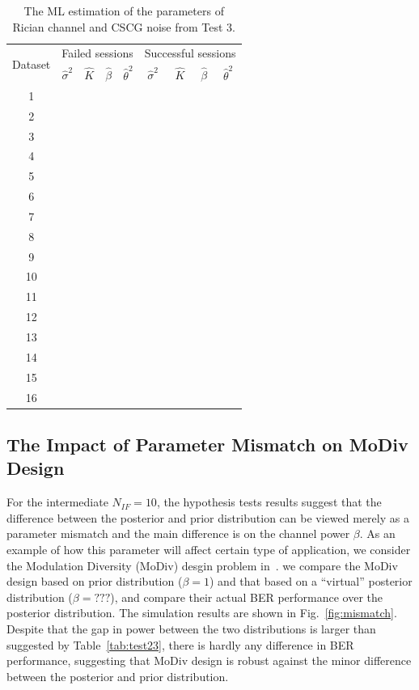 \documentclass[journal,draftcls,onecolumn,12pt,twoside]{IEEEtran}
\begin{document}
\begin{table}[!t]
  \renewcommand{\arraystretch}{1.3}
  \caption{The ML estimation of the parameters of Rician channel and CSCG
  noise from Test 3.}
  \label{tab:ML}
  \centering
  \begin{tabular}{c|cccc|cccc}
    \hline
    \multirow{2}{*}{Dataset}  & \multicolumn{4}{c|}{Failed sessions} &
    \multicolumn{4}{c}{Successful sessions} \\
    \cline{2-9}
    & $\hat{\sigma}^2$ & $\hat{K}$ & $\hat{\beta}$ & $\hat{\theta}^2$ &
    $\hat{\sigma}^2$ & $\hat{K}$ & $\hat{\beta}$ & $\hat{\theta}^2$ \\
    \hline
    1 &  &  &  &  &  &  &  &  \\
    2 &  &  &  &  &  &  &  & \\
    3 &  &  &  &  &  &  &  & \\
    4 &  &  &  &  &  &  &  & \\
    \hline
    5 &  &  &  &  &  &  &  & \\
    6 &  &  &  &  &  &  &  & \\
    7 &  &  &  &  &  &  &  & \\
    8 &  &  &  &  &  &  &  & \\
    \hline
    9 &  &  &  &  &  &  &  & \\
    10 &  &  &  &  &  &  &  & \\
    11 &  &  &  &  &  &  &  & \\
    12 &  &  &  &  &  &  &  & \\
    \hline
    13 &  &  &  &  &  &  &  & \\
    14 &  &  &  &  &  &  &  & \\
    15 &  &  &  &  &  &  &  & \\
    16 &  &  &  &  &  &  &  & \\
    \hline
  \end{tabular}
\end{table}
  
\subsection{The Impact of Parameter Mismatch on MoDiv Design}
For the intermediate $N_{IF} = 10$, the hypothesis tests results suggest that
the difference between the posterior and prior distribution can be viewed
merely as a parameter mismatch and the main difference is on the channel power
$\beta$. As an example of how this parameter will affect certain type of
application, we consider the Modulation Diversity (MoDiv) desgin problem
in~\cite{}\cite{}. we compare the MoDiv design based on prior distribution
($\beta = 1$) and that based on a ``virtual'' posterior distribution
($\beta = ???$), and compare their actual BER performance over
the posterior distribution. The simulation results are shown in Fig.~\ref{fig:mismatch}.
Despite that the gap in power between the two distributions is larger than
suggested by Table~\ref{tab:test23}, there is hardly any difference in BER
performance, suggesting that MoDiv design is robust against the minor
difference between the posterior and prior distribution.
\end{document}
